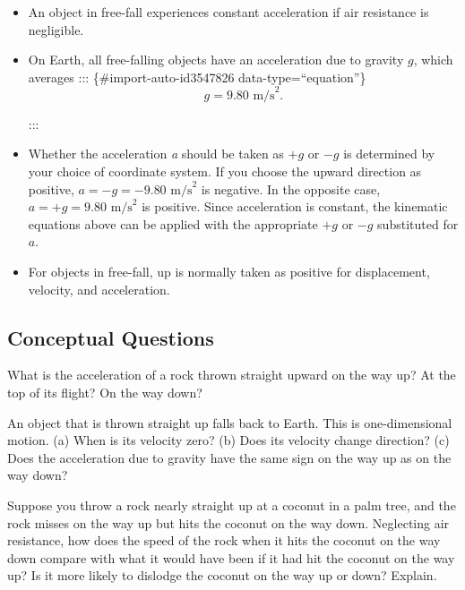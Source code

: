 \documentclass[
]{book}
\begin{document}
\begin{itemize}
\item
  \protect\hypertarget{import-auto-id1715211}{}{An object in free-fall experiences constant acceleration if air
  resistance is negligible.}
\item
  \protect\hypertarget{import-auto-id1715213}{}{On Earth, all free-falling objects have an acceleration due to
  gravity \(g{}\), which averages}
  ::: \{\#import-auto-id3547826 data-type=``equation''\}
  \[{{{g = 9}\text{.}\text{80\ m/s}^{2}}.}{}\]

  :::
\item
  \protect\hypertarget{import-auto-id2150922}{}{Whether the acceleration \emph{a} should be taken as \({+ g}{}\) or
  \({- g}{}\) is determined by your choice of coordinate system. If you
  choose the upward direction as positive,
  \({{a = {- g}} = {- 9}}\text{.}\text{80\ m}\text{/s}^{2}\) is
  negative. In the opposite case,
  \({a = {{+g} = 9}\text{.}\text{80\ m/s}^{2}}{}\) is positive. Since
  acceleration is constant, the kinematic equations above can be
  applied with the appropriate \({+ g}{}\) or \({- g}{}\) substituted for
  \(a{}\).}
\item
  \protect\hypertarget{import-auto-id4051701}{}{For objects in free-fall, up is normally taken as positive for
  displacement, velocity, and acceleration.}
\end{itemize}

\hypertarget{fs-id1358164}{}
\hypertarget{conceptual-questions-5}{%
\subsection{Conceptual Questions}\label{conceptual-questions-5}}

\hypertarget{fs-id1427339}{}
\leavevmode{}%
What is the acceleration of a rock thrown straight upward on the way up?
At the top of its flight? On the way down?

\hypertarget{fs-id3606158}{}
\leavevmode{}%
An object that is thrown straight up falls back to Earth. This is
one-dimensional motion. (a) When is its velocity zero? (b) Does its
velocity change direction? (c) Does the acceleration due to gravity have
the same sign on the way up as on the way down?

\hypertarget{fs-id2044867}{}
\leavevmode{}%
Suppose you throw a rock nearly straight up at a coconut in a palm tree,
and the rock misses on the way up but hits the coconut on the way down.
Neglecting air resistance, how does the speed of the rock when it hits
the coconut on the way down compare with what it would have been if it
had hit the coconut on the way up? Is it more likely to dislodge the
coconut on the way up or down? Explain.
\end{document}
